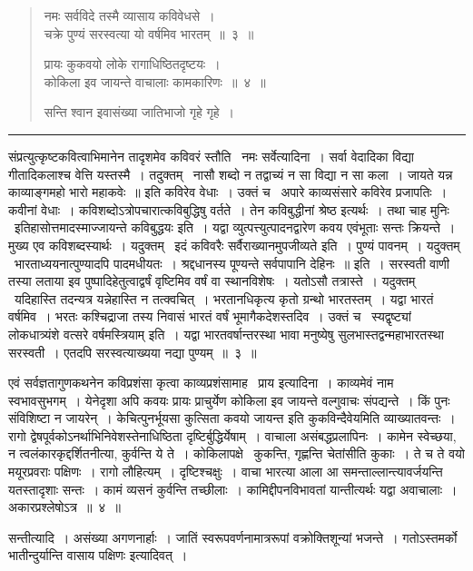 \documentclass[11pt, openany]{book}
\makeatletter
\newcommand{\devanagarinumeral}[1]{
\devanagaridigits{\number \csname c@#1\endcsname}} %
\makeatother
\begin{document}
\newpage
{}
\fancyhead[LE,RO]{\thepage}
\renewcommand{\thepage}{\devanagarinumeral{page}}
\setcounter{page}{2}

\begin{quote}
{\ha नमः सर्वविदे तस्मै व्यासाय कविवेधसे~।\\
चक्रे पुण्यं सरस्वत्या यो वर्षमिव भारतम्~॥~३~॥

प्रायः कुकवयो लोके रागाधिष्ठितदृष्टयः~।\\
कोकिला इव जायन्ते वाचालाः कामकारिणः~॥~४~॥

सन्ति श्वान इवासंख्या जातिभाजो गृहे गृहे~।}
\end{quote}

\hrule

{\s संप्रत्युत्कृष्टकवित्वाभिमानेन तादृशमेव कविवरं स्तौति \textendash\ {\qtt नमः सर्वेत्यादिना}~। सर्वा वेदादिका विद्या गीतादिकलाश्च वेत्ति यस्तस्मै~। तदुक्तम् \textendash\ {\qt नासौ शब्दो न तद्वाच्यं न सा विद्या न सा कला~। जायते यन्न काव्याङ्गमहो भारो महाकवेः~॥} इति कविरेव वेधाः~। उक्तं च \textendash\ {\qt अपारे काव्यसंसारे कविरेव प्रजापतिः}~। कवीनां वेधाः~। कविशब्दोऽत्रोपचारात्कविबुद्धिषु वर्तते~। तेन कविबुद्धीनां श्रेष्ठ इत्यर्थः~। तथा चाह मुनिः \textendash\ {\qt इतिहासोत्तमादस्माज्जायन्ते कविबुद्धयः} इति~। यद्वा व्युत्पत्त्युत्पादनद्वारेण कवय एवंभूताः सन्तः क्रियन्ते~। मुख्य एव कविशब्दस्यार्थः~। यदुक्तम् \textendash\ {\qt इदं कविवरैः सर्वैराख्यानमुपजीव्यते} इति~। पुण्यं पावनम्~। यदुक्तम् \textendash\ {\qt भारताध्ययनात्पुण्यादपि पादमधीयतः~। श्रद्दधानस्य पूण्यन्ते सर्वपापानि देहिनः~॥} इति~। सरस्वती वाणी तस्या लताया इव पुष्पादिहेतुत्वाद्वर्षं वृष्टिमिव वर्षं वा स्थानविशेषः~। यतोऽसौ तत्रास्ते~। यदुक्तम् \textendash\ {\qt यदिहास्ति तदन्यत्र यन्नेहास्ति न तत्क्वचित्}~। भरतानधिकृत्य कृतो ग्रन्थो भारतस्तम्~। यद्वा भारतं वर्षमिव~। भरतः कश्चिद्राजा तस्य निवासं भारतं वर्षं भूमागैकदेशस्तदिव~। उक्तं च \textendash\ {\qt स्यद्वृष्ट्यां लोकधात्र्यंशे वत्सरे वर्षमस्त्रियाम्} इति~। यद्वा भारतवर्षान्तरस्था भावा मनुष्येषु सुलभास्तद्वन्महाभारतस्था सरस्वती~। एतदपि सरस्वत्याख्यया नद्या पुण्यम्~॥~३~॥

एवं सर्वज्ञतागुणकथनेन कविप्रशंसा कृत्वा काव्यप्रशंसामाह \textendash\ {\qtt प्राय इत्यादिना}~। काव्यमेवं नाम स्वभावसुभगम्~। येनेदृशा अपि कवयः प्रायः प्राचुर्येण कोकिला इव जायन्ते वल्गुवाचः संपद्यन्ते~। किं पुनः संविशिष्टा न जायरेन्~। केचित्पुनर्भूयसा कुत्सिता कवयो जायन्त इति कुकविन्दैवेयमिति व्याख्यातवन्तः~। रागो द्वेषपूर्वकोऽनर्थाभिनिवेशस्तेनाधिष्ठिता दृष्टिर्बुद्धिर्येषाम्~। वाचाला असंबद्धप्रलापिनः~। कामेन स्वेच्छया, न त्वलंकारकृद्दर्शितनीत्या, कुर्वन्ति ये ते~। कोकिलापक्षे \textendash\ कुकन्ति, गृह्णन्ति चेतांसीति कुकाः~। ते च ते वयो मयूरप्रवराः पक्षिणः~। रागो लौहित्यम्~। दृष्टिश्चक्षुः~। वाचा भारत्या आला आ समन्ताल्लान्त्यावर्जयन्ति यतस्तादृशाः सन्तः~। कामं व्यसनं कुर्वन्ति तच्छीलाः~। कामिद्दीपनविभावतां यान्तीत्यर्थः यद्वा अवाचालाः~। अकारप्रश्लेषोऽत्र~॥~४~॥

{\qtt सन्तीत्यादि}~। असंख्या अगणनार्हाः~। जातिं स्वरूपवर्णनामात्ररूपां वक्रोक्तिशून्यां भजन्ते~। {\qt गतोऽस्तमर्को भातीन्दुर्यान्ति वासाय पक्षिणः} इत्यादिवत्~।}
\end{document}
